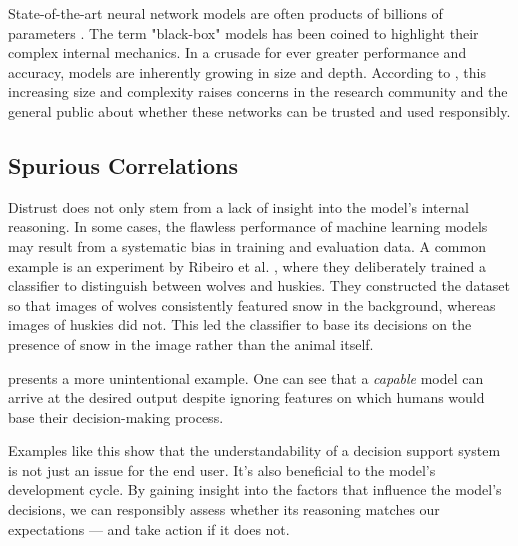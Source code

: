 State-of-the-art neural network models are often products of billions of parameters \cite{arrieta-taxonomy}.
The term "black-box" models has been coined to highlight their complex internal mechanics.
In a crusade for ever greater performance and accuracy, models are inherently growing in size and depth.
According to \cite{arrieta-taxonomy, xai-survey}, this increasing size and complexity raises concerns in the research community and the general public about whether these networks can be trusted and used responsibly.

\subsection*{Spurious Correlations}

Distrust does not only stem from a lack of insight into the model's internal reasoning.
In some cases, the flawless performance of machine learning models may result from a systematic bias in training and evaluation data.
A common example is an experiment by Ribeiro et al. \cite{xai-husky}, where they deliberately trained a classifier to distinguish between wolves and huskies.
They constructed the dataset so that images of wolves consistently featured snow in the background, whereas images of huskies did not.
This led the classifier to base its decisions on the presence of snow in the image rather than the animal itself. 

 presents a more unintentional example.
One can see that a \emph{capable} model can arrive at the desired output despite ignoring features on which humans would base their decision-making process. 

Examples like this show that the understandability of a decision support system is not just an issue for the end user.
It's also beneficial to the model's development cycle.
By gaining insight into the factors that influence the model's decisions, we can responsibly assess whether its reasoning matches our expectations --- and take action if it does not.

